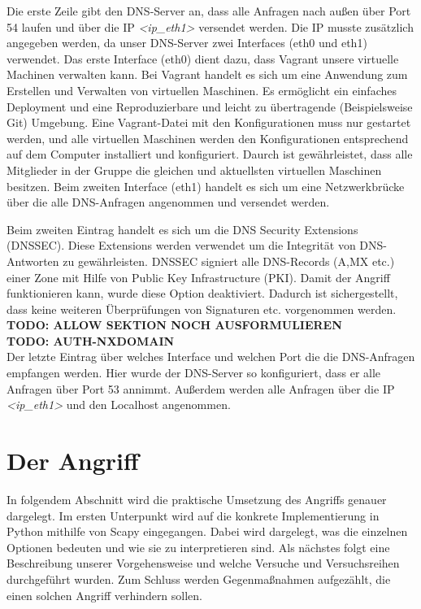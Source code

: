 \documentclass[10pt,a4paper]{article}
\begin{document}
Die erste Zeile gibt den DNS-Server an, dass alle Anfragen nach außen über Port 54 laufen und über die IP \emph{<ip\_eth1>} versendet werden. Die IP musste zusätzlich angegeben werden, da unser DNS-Server zwei Interfaces (eth0 und eth1) verwendet. Das erste Interface (eth0) dient dazu, dass Vagrant unsere virtuelle Machinen verwalten kann. Bei Vagrant handelt es sich um eine Anwendung zum Erstellen und Verwalten von virtuellen Maschinen. Es ermöglicht ein einfaches Deployment und eine Reproduzierbare und leicht zu übertragende (Beispielsweise Git) Umgebung. Eine Vagrant-Datei mit den Konfigurationen muss nur gestartet werden, und alle virtuellen Maschinen werden den Konfigurationen entsprechend auf dem Computer installiert und konfiguriert. Daurch ist gewährleistet, dass alle Mitglieder in der Gruppe die gleichen und aktuellsten virtuellen Maschinen besitzen. Beim zweiten Interface (eth1) handelt es sich um eine Netzwerkbrücke über die alle DNS-Anfragen angenommen und versendet werden.

Beim zweiten Eintrag handelt es sich um die DNS Security Extensions (DNSSEC). Diese Extensions werden verwendet um die Integrität von DNS-Antworten zu gewährleisten. DNSSEC signiert alle DNS-Records (A,MX etc.) einer Zone mit Hilfe von Public Key Infrastructure (PKI). Damit der Angriff funktionieren kann, wurde diese Option deaktiviert. Dadurch ist sichergestellt, dass keine weiteren Überprüfungen von Signaturen etc. vorgenommen werden.\\

\textbf{TODO: ALLOW SEKTION NOCH AUSFORMULIEREN}\\

\textbf{TODO: AUTH-NXDOMAIN}\\

Der letzte Eintrag über welches Interface und welchen Port die die DNS-Anfragen empfangen werden. Hier wurde der DNS-Server so konfiguriert, dass er alle Anfragen über Port 53 annimmt. Außerdem werden alle Anfragen über die IP \emph{<ip\_eth1>} und den Localhost angenommen.

\section{Der Angriff}
In folgendem Abschnitt wird die praktische Umsetzung des Angriffs genauer dargelegt. Im ersten Unterpunkt wird auf die konkrete Implementierung in Python mithilfe von Scapy eingegangen. Dabei wird dargelegt, was die einzelnen Optionen bedeuten und wie sie zu interpretieren sind. Als nächstes folgt eine Beschreibung unserer Vorgehensweise und welche Versuche und Versuchsreihen durchgeführt wurden. Zum Schluss werden Gegenmaßnahmen aufgezählt, die einen solchen Angriff verhindern sollen.
\end{document}
